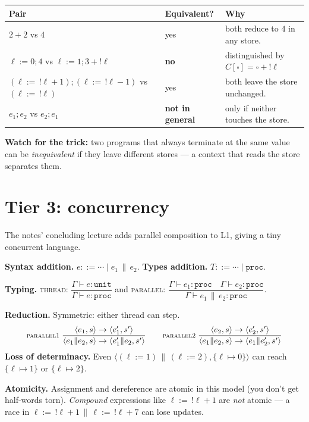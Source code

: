 \documentclass[11pt,a4paper]{article}
\newcommand{\rname}[1]{\textsc{\footnotesize#1}}
\begin{document}
\begin{center}
\begin{tabular}{lll}
\hline
\textbf{Pair} & \textbf{Equivalent?} & \textbf{Why} \\
\hline
$2 + 2$ vs $4$               & yes        & both reduce to $4$ in any store. \\
$\ell := 0; 4$ vs $\ell := 1; 3+!\ell$ & \textbf{no} & distinguished by $C[\square] = \square + !\ell$ \\
$(\ell :=\,!\ell + 1); (\ell :=\,!\ell - 1)$ vs $(\ell :=\,!\ell)$ & yes & both leave the store unchanged. \\
$e_1; e_2$ vs $e_2; e_1$ & \textbf{not in general} & only if neither touches the store. \\
\hline
\end{tabular}
\end{center}

\textbf{Watch for the trick:} two programs that always terminate at the same value can be \emph{inequivalent} if they leave different stores --- a context that reads the store separates them.

\hrulefill

\section{Tier 3: concurrency}

The notes' concluding lecture adds parallel composition to L1, giving a tiny concurrent language.

\textbf{Syntax addition.} $e ::= \cdots \mid e_1 \,\|\, e_2$. \textbf{Types addition.} $T ::= \cdots \mid \texttt{proc}$.

\textbf{Typing.} \rname{thread}: $\dfrac{\Gamma \vdash e : \texttt{unit}}{\Gamma \vdash e : \texttt{proc}}$ and \rname{parallel}: $\dfrac{\Gamma \vdash e_1 : \texttt{proc} \quad \Gamma \vdash e_2 : \texttt{proc}}{\Gamma \vdash e_1 \,\|\, e_2 : \texttt{proc}}$.

\textbf{Reduction.} Symmetric: either thread can step.
\[
\rname{parallel1}\;\dfrac{\langle e_1, s\rangle \to \langle e_1', s'\rangle}{\langle e_1 \| e_2, s\rangle \to \langle e_1' \| e_2, s'\rangle} \qquad
\rname{parallel2}\;\dfrac{\langle e_2, s\rangle \to \langle e_2', s'\rangle}{\langle e_1 \| e_2, s\rangle \to \langle e_1 \| e_2', s'\rangle}
\]
\textbf{Loss of determinacy.} Even $\langle (\ell := 1) \,\|\, (\ell := 2), \{\ell \mapsto 0\}\rangle$ can reach $\{\ell \mapsto 1\}$ or $\{\ell \mapsto 2\}$.

\textbf{Atomicity.} Assignment and dereference are atomic in this model (you don't get half-words torn). \emph{Compound} expressions like $\ell :=\,!\ell + 1$ are \emph{not} atomic --- a race in $\ell :=\,!\ell + 1 \,\|\, \ell :=\,!\ell + 7$ can lose updates.
\end{document}
